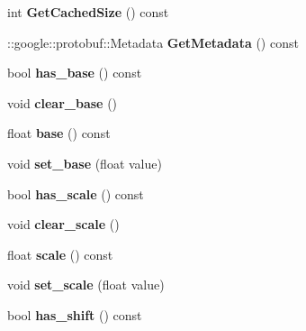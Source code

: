 \begin{DoxyCompactItemize}
int {\bfseries Get\+Cached\+Size} () const
\item 
\mbox{\label{classcaffe_1_1_exp_parameter_ae5dab48cc49e06fa3dedaaaa25b42afa}} 
\+::google\+::protobuf\+::\+Metadata {\bfseries Get\+Metadata} () const
\item 
\mbox{\label{classcaffe_1_1_exp_parameter_a882ba10c89d39fe09951f77b33c6efc6}} 
bool {\bfseries has\+\_\+base} () const
\item 
\mbox{\label{classcaffe_1_1_exp_parameter_a5994d9e4d4f655bb04cbd438e2a2b12c}} 
void {\bfseries clear\+\_\+base} ()
\item 
\mbox{\label{classcaffe_1_1_exp_parameter_ad462706ac58bd597b5333c18b8c4fd0e}} 
float {\bfseries base} () const
\item 
\mbox{\label{classcaffe_1_1_exp_parameter_a9c0983fd51fe92ec32e174d194dddd7c}} 
void {\bfseries set\+\_\+base} (float value)
\item 
\mbox{\label{classcaffe_1_1_exp_parameter_a036bd3adb407281938cd7e4ce7fd22fe}} 
bool {\bfseries has\+\_\+scale} () const
\item 
\mbox{\label{classcaffe_1_1_exp_parameter_a5c1efb26cd957df40ea658e21ed96284}} 
void {\bfseries clear\+\_\+scale} ()
\item 
\mbox{\label{classcaffe_1_1_exp_parameter_a605697232f2ed3f4e8e0fda2c90315e8}} 
float {\bfseries scale} () const
\item 
\mbox{\label{classcaffe_1_1_exp_parameter_a83ca370e97d07e2846fd0317924d2139}} 
void {\bfseries set\+\_\+scale} (float value)
\item 
\mbox{\label{classcaffe_1_1_exp_parameter_a5523f2007ce777ca1f137eae1a7bbeda}} 
bool {\bfseries has\+\_\+shift} () const
\item 
\mbox{\label{classcaffe_1_1_exp_parameter_a6b8827b941b95a703ade4a82088bb76d}} 

\end{DoxyCompactItemize}

